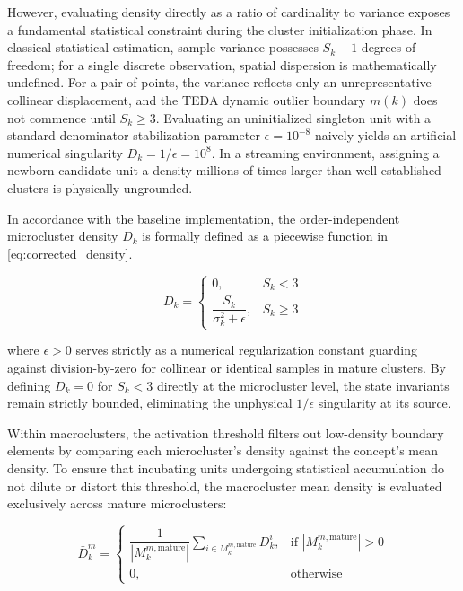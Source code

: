 However, evaluating density directly as a ratio of cardinality to variance exposes a fundamental statistical constraint during the cluster initialization phase. In classical statistical estimation, sample variance possesses $S_k - 1$ degrees of freedom; for a single discrete observation, spatial dispersion is mathematically undefined. For a pair of points, the variance reflects only an unrepresentative collinear displacement, and the TEDA dynamic outlier boundary $m(k)$ does not commence until $S_k \ge 3$. Evaluating an uninitialized singleton unit with a standard denominator stabilization parameter $\epsilon = 10^{-8}$ naively yields an artificial numerical singularity $D_k = 1/\epsilon = 10^8$. In a streaming environment, assigning a newborn candidate unit a density millions of times larger than well-established clusters is physically ungrounded.

In accordance with the baseline implementation, the order-independent microcluster density $D_k$ is formally defined as a piecewise function in \cref{eq:corrected_density}.

\begin{equation}
    D_k = \begin{cases}
        0, & S_k < 3 \\
        \dfrac{S_k}{\sigma^2_k + \epsilon}, & S_k \ge 3
    \end{cases}
    \label{eq:corrected_density}
\end{equation}

where $\epsilon > 0$ serves strictly as a numerical regularization constant guarding against division-by-zero for collinear or identical samples in mature clusters. By defining $D_k = 0$ for $S_k < 3$ directly at the microcluster level, the state invariants remain strictly bounded, eliminating the unphysical $1/\epsilon$ singularity at its source.

Within macroclusters, the activation threshold filters out low-density boundary elements by comparing each microcluster's density against the concept's mean density. To ensure that incubating units undergoing statistical accumulation do not dilute or distort this threshold, the macrocluster mean density is evaluated exclusively across mature microclusters:

\begin{equation}
    \bar{D}_k^m = \begin{cases}
        \dfrac{1}{|M_k^{m, \text{mature}}|} \displaystyle\sum_{i \in M_k^{m, \text{mature}}} D_k^i, & \text{if } |M_k^{m, \text{mature}}| > 0 \\
        0, & \text{otherwise}
    \end{cases}
    \label{eq:mature_mean_density}
\end{equation}

